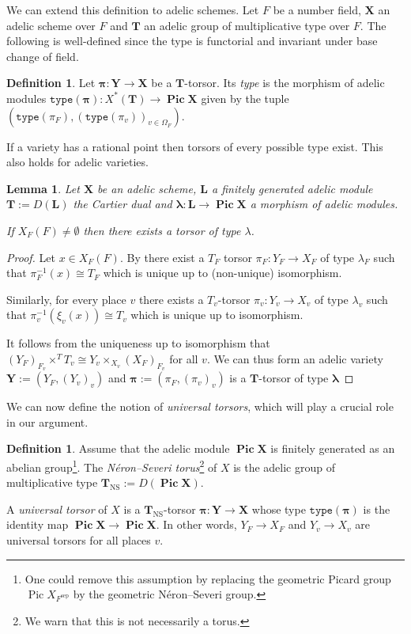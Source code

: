 \documentclass[a4paper,11pt,reqno]{amsart}
\DeclareMathOperator{\Pic}{Pic}
\DeclareMathOperator{\NS}{NS}
\DeclareMathOperator{\sep}{sep}
\newtheorem{lemma}[theorem]{Lemma}
\theoremstyle{definition}
\newtheorem{definition}[theorem]{Definition}
\begin{document}
We can extend this definition to adelic schemes. Let $F$ be a number field, $\mathbf{X}$ an adelic scheme over $F$ and $\mathbf{T}$ an adelic group of multiplicative type over $F$. The following is well-defined since the type is functorial and invariant under base change of field.
\begin{definition}
	Let $\bm{\pi}: \mathbf{Y} \to \mathbf{X}$ be a $\mathbf{T}$-torsor. Its \emph{type} is the morphism of adelic modules 
	$\texttt{type}(\bm{\pi}): X^*(\mathbf{T}) \to \bm{\Pic} \mathbf{X}$ given by the tuple $(\texttt{type}(\pi_F), (\texttt{type}(\pi_v))_{v \in \Omega_F})$.
\end{definition}
If a variety has a rational point then torsors of every possible type exist. This also holds for adelic varieties.
\begin{lemma}
	Let $\mathbf{X}$ be an adelic scheme, $\mathbf{L}$ a finitely generated adelic module $\mathbf{T} := D(\mathbf{L})$ the Cartier dual and $\bm{\lambda}: \mathbf{L} \to \bm{\Pic} \mathbf{X}$ a morphism of adelic modules.
	
	If $X_F(F) \neq \emptyset$ then there exists a torsor of type $\lambda$.	
	\label{Torsors of abitrary type exist if there is a rational point}
\end{lemma}
\begin{proof}	
	Let $x \in X_F(F)$. By \cite[p. 426]{Colliot1987Descente} there exist a $T_F$ torsor $\pi_F: Y_F \to X_F$ of type $\lambda_F$ such that $\pi_F^{-1}(x) \cong T_F$ which is unique up to (non-unique) isomorphism.
	
	Similarly, for every place $v$ there exists a $T_v$-torsor $\pi_v: Y_v \to X_v$ of type $\lambda_v$ such that $\pi_v^{-1}(\xi_v(x)) \cong T_v$ which is unique up to isomorphism.
	
	It follows from the uniqueness up to isomorphism that $(Y_F)_{F_v} \times^T T_v \cong Y_v \times_{X_v} (X_F)_{F_v}$ for all $v$. We can thus form an adelic variety $\mathbf{Y} := (Y_F, (Y_v)_v)$ and $\bm{\pi} := (\pi_F, (\pi_v)_v)$ is a $\mathbf{T}$-torsor of type $\bm{\lambda}$
\end{proof}
We can now define the notion of \emph{universal torsors}, which will play a crucial role in our argument.
\begin{definition}
	Assume that the adelic module $\bm{\Pic} \mathbf{X}$ is finitely generated as an abelian group\footnote{One could remove this assumption by replacing the geometric Picard group $\Pic X_{F^{\sep}}$ by the geometric N\'eron–Severi group.}. The \emph{N\'eron–Severi torus}\footnote{We warn that this is not necessarily a torus.} of $X$ is the adelic group of multiplicative type $\mathbf{T}_{\NS} := D(\bm{\Pic} \mathbf{X})$.

	A \emph{universal torsor} of $X$ is a $\mathbf{T}_{\NS}$-torsor $\bm{\pi}: \mathbf{Y} \to \mathbf{X}$ whose type $\texttt{type}(\bm{\pi})$ is the identity map $\bm{\Pic} \mathbf{X} \to \bm{\Pic} \mathbf{X}$. In other words, $Y_F \to X_F$ and $Y_v \to X_v$ are universal torsors for all places $v$.
\end{definition}
\end{document}
